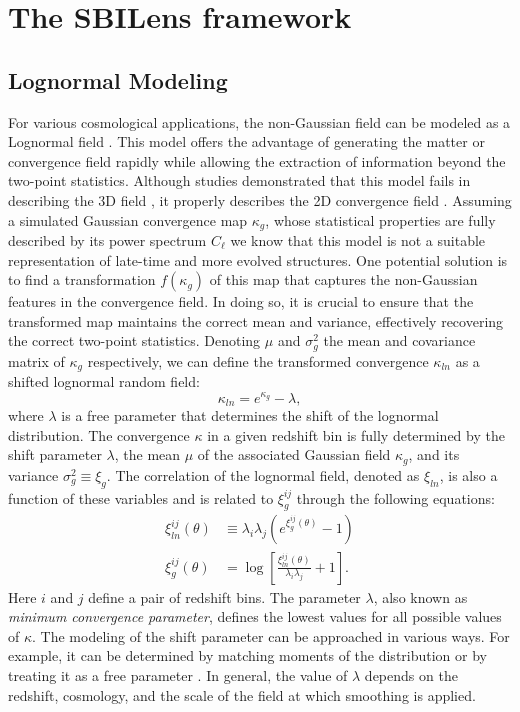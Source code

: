\documentclass{aa}
\begin{document}
\section{The SBILens framework}
\subsection{Lognormal Modeling}
For various cosmological applications, the non-Gaussian field can be modeled as a Lognormal field \citep{coles1991lognormal,bohm2017bayesian}.
This model offers the advantage of generating the matter or convergence field rapidly while allowing the extraction of information beyond the two-point statistics. 
Although studies demonstrated that this model fails in describing the 3D field \citep{klypin2018density}, it properly describes the 2D convergence field \citep{clerkin2017testing, xavier2016improving}.
Assuming a simulated Gaussian convergence map $\kappa_g$, whose statistical properties are fully described by its power spectrum $C_{\ell}$ we know that this model is not a suitable representation of late-time and more evolved structures. One potential solution is to find a transformation $f(\kappa_g)$ of this map that captures the non-Gaussian features in the convergence field. In doing so, it is crucial to ensure that the transformed map maintains the correct mean and variance, effectively recovering the correct two-point statistics.
Denoting $\mu$ and $\sigma_g^2$ the mean and covariance matrix of $\kappa_g$ respectively, we can define the transformed convergence $\kappa_{ln}$ as a shifted lognormal random field:
\begin{equation}\label{Eq:log_norm_kappa}
    \kappa_{ln}=e^{\kappa_{g}}-\lambda, 
\end{equation}
where $\lambda$ is a free parameter that determines the shift of the lognormal distribution. The convergence $\kappa$ in a given redshift bin is fully determined by the shift parameter $\lambda$, the mean $\mu$ of the associated Gaussian field $\kappa_g$, and its variance $\sigma_{g}^2\equiv \xi_g$.
The correlation of the lognormal field, denoted as $\xi_{ln}$, is also a function of these variables and is related to $\xi^{ij}_g$ through the following equations:
\begin{align}
    \xi^{ij}_{ln}(\theta) & \equiv \lambda_i \lambda_j (e^{ \xi^{ij}_g(\theta)}-1) \nonumber \\ 
    \xi^{ij}_g(\theta)&=\log{\left[ \frac{\xi^{ij}_{ln}(\theta)}{\lambda_i \lambda_j}+1\right ]}. \label{Eq:log_norm_corr}
\end{align}
Here $i$ and $j$ define a pair of redshift bins.
The parameter $\lambda$, also known as \textit{minimum convergence
parameter}, defines the lowest values for all possible values of $\kappa$.
The modeling of the shift parameter can be approached in various ways. For example, it can be determined by matching moments of the distribution \citep{xavier2016improving} or by treating it as a free parameter \citep{hilbert2011cosmic}. In general, the value of $\lambda$ depends on the redshift, cosmology, and the scale of the field at which smoothing is applied.
\end{document}
